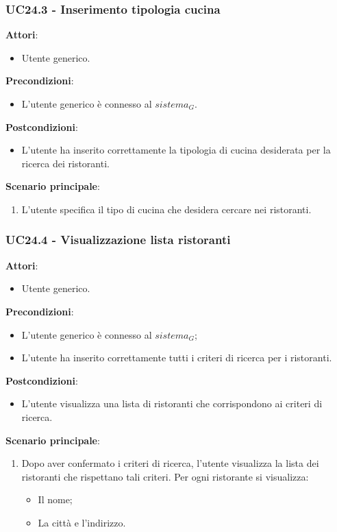 \subsubsection{UC24.3 - Inserimento tipologia cucina
}\label{usecase:24_3}
\textbf{Attori}:
\begin{itemize}
    \item Utente generico.
\end{itemize}
\textbf{Precondizioni}:
\begin{itemize}
    \item L'utente generico è connesso al $\textit{sistema}_G$.
\end{itemize}
\textbf{Postcondizioni}:
\begin{itemize}
    \item L'utente ha inserito correttamente la tipologia di cucina desiderata per la ricerca dei ristoranti.
\end{itemize}
\textbf{Scenario principale}:
\begin{enumerate}
    \item L'utente specifica il tipo di cucina che desidera cercare nei ristoranti.
\end{enumerate}


\subsubsection{UC24.4 - Visualizzazione lista ristoranti
}\label{usecase:24_4}
\textbf{Attori}:
\begin{itemize}
    \item Utente generico.
\end{itemize}
\textbf{Precondizioni}:
\begin{itemize}
    \item L'utente generico è connesso al $\textit{sistema}_G$;
    \item L'utente ha inserito correttamente tutti i criteri di ricerca per i ristoranti.
\end{itemize}
\textbf{Postcondizioni}:
\begin{itemize}
    \item L'utente visualizza una lista di ristoranti che corrispondono ai criteri di ricerca.
\end{itemize}
\textbf{Scenario principale}:
\begin{enumerate}
    \item Dopo aver confermato i criteri di ricerca, l'utente visualizza la lista dei ristoranti che rispettano tali criteri. Per ogni ristorante si visualizza:
    \begin{itemize}
        \item Il nome;
        \item La città e l'indirizzo.
    \end{itemize}
\end{enumerate}



\newpage